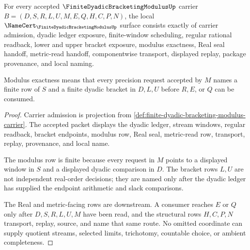 \begin{theorem}
\label{thm:finite-dyadic-bracketing-modulus-namecert-obligations}
For every accepted $\FiniteDyadicBracketingModulusUp$ carrier $B=(D,S,R,L,U,M,E,Q,H,C,P,N)$, the local $\NameCert_{\FiniteDyadicBracketingModulusUp}$ surface consists exactly of carrier admission, dyadic ledger exposure, finite-window scheduling, regular rational readback, lower and upper bracket exposure, modulus exactness, Real seal handoff, metric-read handoff, componentwise transport, displayed replay, package provenance, and local naming.

Modulus exactness means that every precision request accepted by $M$ names a finite row of $S$ and a finite dyadic bracket in $D,L,U$ before $R,E$, or $Q$ can be consumed.
\end{theorem}
\begin{proof}
Carrier admission is projection from \autoref{def:finite-dyadic-bracketing-modulus-carrier}. The accepted packet displays the dyadic ledger, stream windows, regular readback, bracket endpoints, modulus row, Real seal, metric-read row, transport, replay, provenance, and local name.

The modulus row is finite because every request in $M$ points to a displayed window in $S$ and a displayed dyadic comparison in $D$. The bracket rows $L,U$ are not independent real-order decisions; they are named only after the dyadic ledger has supplied the endpoint arithmetic and slack comparisons.

The Real and metric-facing rows are downstream. A consumer reaches $E$ or $Q$ only after $D,S,R,L,U,M$ have been read, and the structural rows $H,C,P,N$ transport, replay, source, and name that same route. No omitted coordinate can supply quotient streams, selected limits, trichotomy, countable choice, or ambient completeness.
\end{proof}

